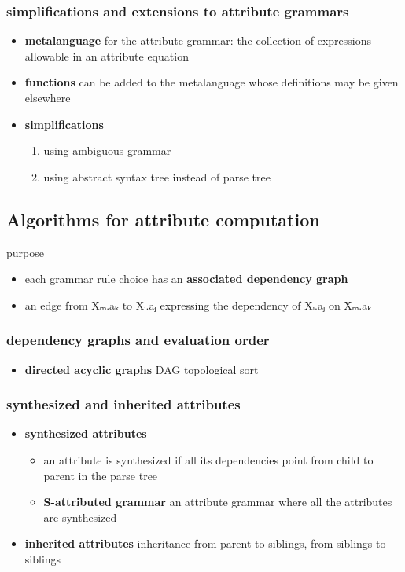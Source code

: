 \documentclass[11pt]{article}
\begin{document}
\subsubsection{simplifications and extensions to attribute grammars}
\label{sec:org629453a}
\begin{itemize}
\item \textbf{metalanguage} for the attribute grammar: the collection of expressions allowable in
an attribute equation
\item \textbf{functions} can be added to the metalanguage whose definitions may be given elsewhere
\item \textbf{simplifications}
\begin{enumerate}
\item using ambiguous grammar
\item using abstract syntax tree instead of parse tree
\end{enumerate}
\end{itemize}

\subsection{Algorithms for attribute computation}
\label{sec:orga156a94}
purpose

\begin{itemize}
\item each grammar rule choice has an \textbf{associated dependency graph}
\item an edge from Xₘ.aₖ to Xᵢ.aⱼ expressing the dependency of Xᵢ.aⱼ on Xₘ.aₖ
\end{itemize}
\subsubsection{dependency graphs and evaluation order}
\label{sec:orgec7a48e}
\begin{itemize}
\item \textbf{directed acyclic graphs} DAG
topological sort
\end{itemize}
\subsubsection{synthesized and inherited attributes}
\label{sec:org9aeb88b}
\begin{itemize}
\item \textbf{synthesized attributes}
\begin{itemize}
\item an attribute is synthesized if all its dependencies point from child to parent in
the parse tree
\item \textbf{S-attributed grammar}
an attribute grammar where all the attributes are synthesized
\end{itemize}
\item \textbf{inherited attributes}
inheritance from parent to siblings, from siblings to siblings
\end{itemize}
\end{document}
